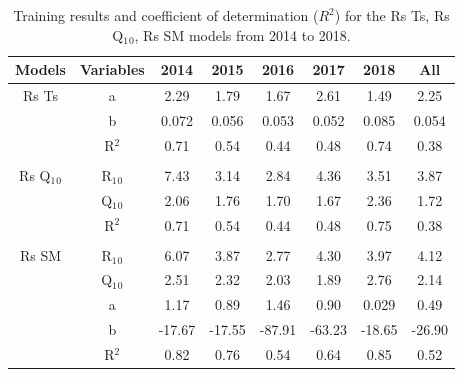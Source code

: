 \documentclass[]{elsarticle} %
\begin{document}
\begin{table}[!h]

\caption{\label{tab:site_info-3}\label{tab:models} Selected values of soil nutrient content of litter fall horizon (LFH), Turkey Point Deciduous (TPD).}
\centering
{}
\end{table}

\begin{table}[!h]

\caption{\label{tab:site_info-4}\label{tab:modelTrain} Training results and coefficient of determination ($R^2$) for the Rs Ts, Rs Q$_1$$_0$, Rs SM models from 2014 to 2018.}
\centering
\fontsize{8}{10}\selectfont
\begin{tabular}[t]{cccccccc}
\toprule
Models & Variables & 2014 & 2015 & 2016 & 2017 & 2018 & All\\
\midrule
\rowcolor{gray!6}  Rs Ts & a & 2.29 & 1.79 & 1.67 & 2.61 & 1.49 & 2.25\\
 & b & 0.072 & 0.056 & 0.053 & 0.052 & 0.085 & 0.054\\
\rowcolor{gray!6}   & R$^2$ & 0.71 & 0.54 & 0.44 & 0.48 & 0.74 & 0.38\\
 &  &  &  &  &  &  \vphantom{1} & \\
\rowcolor{gray!6}  Rs Q$_1$$_0$ & R$_1$$_0$ & 7.43 & 3.14 & 2.84 & 4.36 & 3.51 & 3.87\\
\addlinespace
 & Q$_1$$_0$ & 2.06 & 1.76 & 1.70 & 1.67 & 2.36 & 1.72\\
\rowcolor{gray!6}   & R$^2$ & 0.71 & 0.54 & 0.44 & 0.48 & 0.75 & 0.38\\
 &  &  &  &  &  &  & \\
\rowcolor{gray!6}  Rs SM & R$_1$$_0$ & 6.07 & 3.87 & 2.77 & 4.30 & 3.97 & 4.12\\
 & Q$_1$$_0$ & 2.51 & 2.32 & 2.03 & 1.89 & 2.76 & 2.14\\
\addlinespace
\rowcolor{gray!6}   & a & 1.17 & 0.89 & 1.46 & 0.90 & 0.029 & 0.49\\
 & b & -17.67 & -17.55 & -87.91 & -63.23 & -18.65 & -26.90\\
\rowcolor{gray!6}   & R$^2$ & 0.82 & 0.76 & 0.54 & 0.64 & 0.85 & 0.52\\
\bottomrule
\end{tabular}
\end{table}
\end{document}
